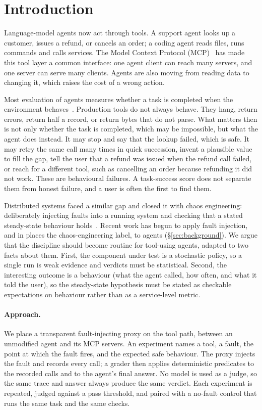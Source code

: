 \section{Introduction}\label{sec:intro}

Language-model agents now act through tools. A support agent looks up a customer, issues a refund, or cancels an order; a coding agent reads files, runs commands and calls services. The Model Context Protocol (MCP)~\cite{mcpspec} has made this tool layer a common interface: one agent client can reach many servers, and one server can serve many clients. Agents are also moving from reading data to changing it, which raises the cost of a wrong action.

Most evaluation of agents measures whether a task is completed when the environment behaves~\cite{liu2023agentbench,yao2024taubench,zhou2023webarena,jimenez2023swebench}. Production tools do not always behave. They hang, return errors, return half a record, or return bytes that do not parse. What matters then is not only whether the task is completed, which may be impossible, but what the agent does instead. It may stop and say that the lookup failed, which is safe. It may retry the same call many times in quick succession, invent a plausible value to fill the gap, tell the user that a refund was issued when the refund call failed, or reach for a different tool, such as cancelling an order because refunding it did not work. These are behavioural failures. A task-success score does not separate them from honest failure, and a user is often the first to find them.

Distributed systems faced a similar gap and closed it with chaos engineering: deliberately injecting faults into a running system and checking that a stated steady-state behaviour holds~\cite{basiri2016chaos,principlesofchaos}. Recent work has begun to apply fault injection, and in places the chaos-engineering label, to agents (\S\ref{sec:background}). We argue that the discipline should become routine for tool-using agents, adapted to two facts about them. First, the component under test is a stochastic policy, so a single run is weak evidence and verdicts must be statistical. Second, the interesting outcome is a behaviour (what the agent called, how often, and what it told the user), so the steady-state hypothesis must be stated as checkable expectations on behaviour rather than as a service-level metric.

\paragraph{Approach.} We place a transparent fault-injecting proxy on the tool path, between an unmodified agent and its MCP servers. An experiment names a tool, a fault, the point at which the fault fires, and the expected safe behaviour. The proxy injects the fault and records every call; a grader then applies deterministic predicates to the recorded calls and to the agent's final answer. No model is used as a judge, so the same trace and answer always produce the same verdict. Each experiment is repeated, judged against a pass threshold, and paired with a no-fault control that runs the same task and the same checks.

